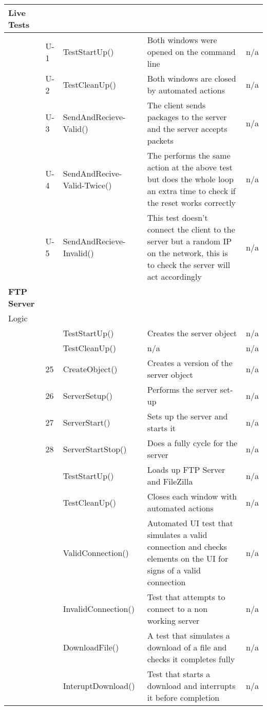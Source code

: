 \begin{longtable}{| p{1.5cm} | p{1.5cm} | p{4cm} | p{5cm} | p{3cm} |}
		Live Tests &&&& \\ \hline
		&U-1& TestStartUp() & Both windows were opened on the command line & n/a \\ \hline
		&U-2& TestCleanUp() & Both windows are closed by automated actions & n/a \\ \hline
		&U-3& SendAndRecieve-Valid() & The client sends packages to the server and the server accepts packets & n/a \\ \hline
		&U-4& SendAndRecive-Valid-Twice() & The performs the same action at the above test but does the whole loop an extra time to check if the reset works correctly & n/a \\ \hline
		&U-5& SendAndRecieve-Invalid() & This test doesn't connect the client to the server but a random IP on the network, this is to check the server will act accordingly & n/a \\ \hline

		\bf{FTP Server} &&&& \\ \hline
		
		Logic &&&& \\ \hline
		&& TestStartUp() & Creates the server object & n/a \\ \hline
		&& TestCleanUp() & n/a & n/a \\ \hline
		&25& CreateObject() & Creates a version of the server object & n/a \\ \hline
		&26& ServerSetup() & Performs the server set-up & n/a \\ \hline
		&27& ServerStart() & Sets up the server and starts it & n/a \\ \hline
		&28& ServerStartStop() & Does a fully cycle for the server & n/a \\ \hline
		
		&& TestStartUp() & Loads up FTP Server and FileZilla & n/a \\ \hline
		&& TestCleanUp() & Closes each window with automated actions & n/a \\ \hline
		&& ValidConnection() & Automated UI test that simulates a valid connection and checks elements on the UI for signs of a valid connection & n/a \\ \hline
		&& InvalidConnection() & Test that attempts to connect to a non working server & n/a \\ \hline
		&& DownloadFile() & A test that simulates a download of a file and checks it completes fully & n/a \\ \hline
		&& InteruptDownload() & Test that starts a download and interrupts it before completion & n/a \\ \hline
	\hline
\end{longtable}

